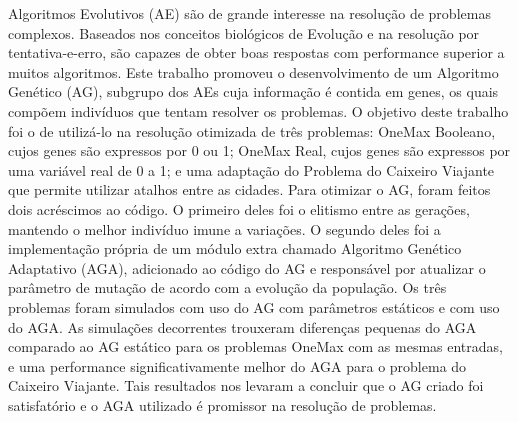 Algoritmos Evolutivos (AE) são de grande interesse na resolução de problemas complexos. Baseados nos conceitos biológicos de Evolução e na resolução por tentativa-e-erro, são capazes de obter boas respostas com performance superior a muitos algoritmos. Este trabalho promoveu o desenvolvimento de um Algoritmo Genético (AG), subgrupo dos AEs cuja informação é contida em genes, os quais compõem indivíduos que tentam resolver os problemas. O objetivo deste trabalho foi o de utilizá-lo na resolução otimizada de três problemas: OneMax Booleano, cujos genes são expressos por 0 ou 1; OneMax Real, cujos genes são expressos por uma variável real de 0 a 1; e uma adaptação do Problema do Caixeiro Viajante que permite utilizar atalhos entre as cidades. Para otimizar o AG, foram feitos dois acréscimos ao código. O primeiro deles foi o elitismo entre as gerações, mantendo o melhor indivíduo imune a variações. O segundo deles foi a implementação própria de um módulo extra chamado Algoritmo Genético Adaptativo (AGA), adicionado ao código do AG e responsável por atualizar o parâmetro de mutação de acordo com a evolução da população. Os três problemas foram simulados com uso do AG com parâmetros estáticos e com uso do AGA. As simulações decorrentes trouxeram diferenças pequenas do AGA comparado ao AG estático para os problemas OneMax com as mesmas entradas, e uma performance significativamente melhor do AGA para o problema do Caixeiro Viajante. Tais resultados nos levaram a concluir que o AG criado foi satisfatório e o AGA utilizado é promissor na resolução de problemas.
